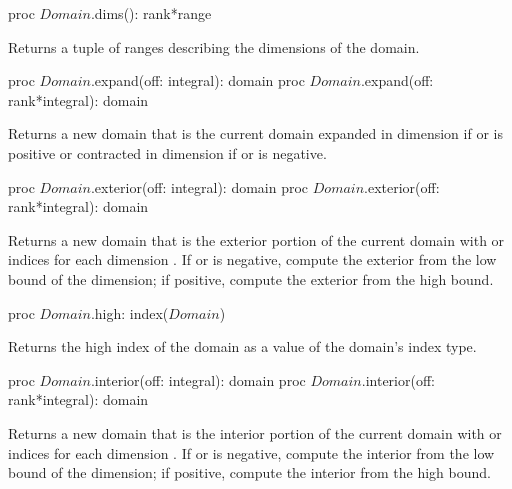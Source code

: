\begin{protohead}
proc $Domain$.dims(): rank*range
\end{protohead}
\begin{protobody}
Returns a tuple of ranges describing the dimensions of the domain.
\end{protobody}


\begin{protohead}
proc $Domain$.expand(off: integral): domain
proc $Domain$.expand(off: rank*integral): domain
\end{protohead}
\begin{protobody}
Returns a new domain that is the current domain expanded in
dimension  if  or  is positive or
contracted in dimension  if  or  is
negative.
\end{protobody}

\begin{protohead}
proc $Domain$.exterior(off: integral): domain
proc $Domain$.exterior(off: rank*integral): domain
\end{protohead}
\begin{protobody}
Returns a new domain that is the exterior portion of the current
domain with  or  indices for each
dimension .  If  or  is negative,
compute the exterior from the low bound of the dimension; if positive,
compute the exterior from the high bound.
\end{protobody}

\begin{protohead}
proc $Domain$.high: index($Domain$)
\end{protohead}
\begin{protobody}
Returns the high index of the domain as a value of the domain's index
type.
\end{protobody}

\begin{protohead}
proc $Domain$.interior(off: integral): domain
proc $Domain$.interior(off: rank*integral): domain
\end{protohead}
\begin{protobody}
Returns a new domain that is the interior portion of the current
domain with  or  indices for each
dimension .  If  or  is negative,
compute the interior from the low bound of the dimension; if positive,
compute the interior from the high bound.
\end{protobody}

